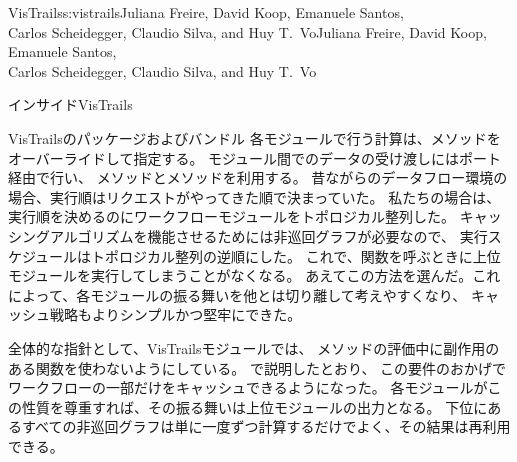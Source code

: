 \begin{aosachaptertoc}{VisTrails}{s:vistrails}{Juliana Freire, David Koop, Emanuele Santos, \\ Carlos Scheidegger, Claudio Silva, and Huy T.\ Vo}{Juliana Freire, David Koop, Emanuele Santos, \\ \hspace*{0.9cm} Carlos Scheidegger, Claudio Silva, and Huy T.\ Vo}
\begin{aosasect1}{インサイドVisTrails}
\begin{aosasect2}{VisTrailsのパッケージおよびバンドル}
各モジュールで行う計算は、メソッドをオーバーライドして指定する。
モジュール間でのデータの受け渡しにはポート経由で行い、
メソッドとメソッドを利用する。
昔ながらのデータフロー環境の場合、実行順はリクエストがやってきた順で決まっていた。
私たちの場合は、実行順を決めるのにワークフローモジュールをトポロジカル整列した。
キャッシングアルゴリズムを機能させるためには非巡回グラフが必要なので、
実行スケジュールはトポロジカル整列の逆順にした。
これで、関数を呼ぶときに上位モジュールを実行してしまうことがなくなる。
あえてこの方法を選んだ。これによって、各モジュールの振る舞いを他とは切り離して考えやすくなり、
キャッシュ戦略もよりシンプルかつ堅牢にできた。

全体的な指針として、VisTrailsモジュールでは、
メソッドの評価中に副作用のある関数を使わないようにしている。
で説明したとおり、
この要件のおかげでワークフローの一部だけをキャッシュできるようになった。
各モジュールがこの性質を尊重すれば、その振る舞いは上位モジュールの出力となる。
下位にあるすべての非巡回グラフは単に一度ずつ計算するだけでよく、その結果は再利用できる。

\end{aosasect2}


\end{aosasect1}
\end{aosachaptertoc}
